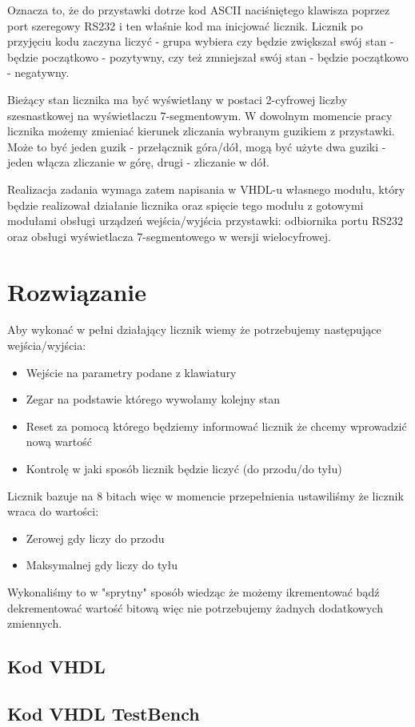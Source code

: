 \documentclass[a4paper,12pt]{extarticle}  %
\begin{document}
Oznacza to, że do przystawki dotrze kod ASCII naciśniętego klawisza poprzez port
szeregowy RS232 i ten właśnie kod ma inicjować licznik.
Licznik po przyjęciu kodu zaczyna liczyć - grupa wybiera czy będzie zwiększał swój
stan - będzie początkowo - pozytywny, czy też zmniejszał swój stan - będzie
początkowo - negatywny.

Bieżący stan licznika ma być wyświetlany w postaci 2-cyfrowej liczby szesnastkowej
na wyświetlaczu 7-segmentowym. W dowolnym momencie pracy licznika możemy
zmieniać kierunek zliczania wybranym guzikiem z przystawki. Może to być jeden guzik
- przełącznik góra/dół, mogą być użyte dwa guziki - jeden włącza zliczanie w górę,
drugi - zliczanie w dół.

Realizacja zadania wymaga zatem napisania w VHDL-u własnego modułu, który będzie
realizował działanie licznika oraz spięcie tego modułu z gotowymi modułami obsługi
urządzeń wejścia/wyjścia przystawki: odbiornika portu RS232 oraz obsługi
wyświetlacza 7-segmentowego w wersji wielocyfrowej.
\section{Rozwiązanie}
Aby wykonać w pełni działający licznik wiemy że potrzebujemy następujące wejścia/wyjścia:
\begin{itemize}
	\item Wejście na parametry podane z klawiatury
	\item Zegar na podstawie którego wywołamy kolejny stan
	\item Reset za pomocą którego będziemy informować licznik że chcemy wprowadzić nową wartość
	\item Kontrolę w jaki sposób licznik będzie liczyć (do przodu/do tyłu)
\end{itemize}
Licznik bazuje na 8 bitach więc w momencie przepełnienia ustawiliśmy że licznik wraca do wartości:
\begin{itemize}
	\item Zerowej gdy liczy do przodu
	\item Maksymalnej gdy liczy do tyłu
\end{itemize}
Wykonaliśmy to w "sprytny" sposób wiedząc że możemy ikrementować bądź dekrementować wartość bitową więc nie potrzebujemy żadnych dodatkowych zmiennych.
\subsection{Kod VHDL}

\subsection{Kod VHDL TestBench}

\end{document}
